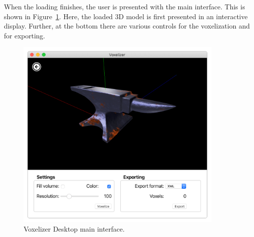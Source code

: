 When the loading finishes, the user is presented with the main interface. This is shown in Figure~\ref{fig:voxelizer-desktop-gui-main-light}. Here, the loaded 3D model is first presented in an interactive display. Further, at the bottom there are various controls for the voxelization and for exporting.
\begin{figure}[htp]
    \centering
    \includegraphics[width=0.9\textwidth]{sections/result/figures/voxelizer-desktop-gui-main-light.png}
    \caption{Voxelizer Desktop main interface.}
    \label{fig:voxelizer-desktop-gui-main-light}
\end{figure}
\clearpage

